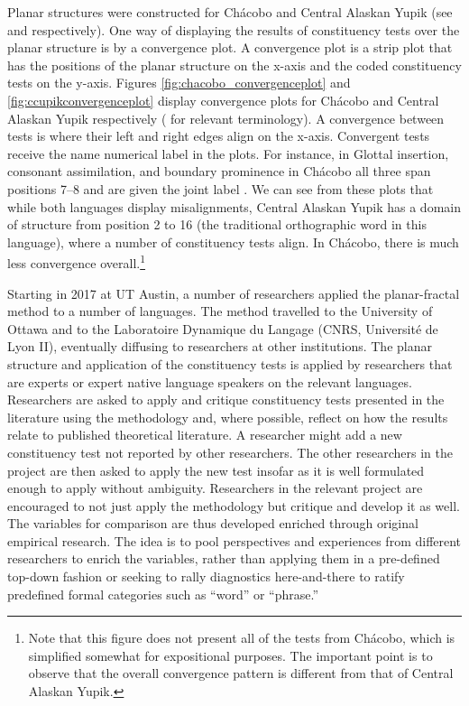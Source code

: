\documentclass[output=paper,hidelinks]{langscibook}
\begin{document}
Planar structures were constructed for Chácobo and Central Alaskan Yupik (see \cite{tallman2021constituency} and  respectively). One way of displaying the results of constituency tests over the planar structure is by a convergence plot. A convergence plot is a strip plot that has the positions of the planar structure on the x-axis and the coded constituency tests on the y-axis. Figures \ref{fig:chacobo_convergenceplot} and \ref{fig:ccupikconvergenceplot} display convergence plots for Chácobo and Central Alaskan Yupik respectively (\citealt{auderset2023constituency} for relevant terminology). A convergence between tests is where their left and right edges align on the x-axis. Convergent tests receive the name numerical label in the plots. For instance, in  Glottal insertion, consonant assimilation, and boundary prominence in Chácobo all three span positions 7--8 and are given the joint label . We can see from these plots that while both languages display misalignments, Central Alaskan Yupik has a domain of structure from position 2 to 16 (the traditional orthographic word in this language), where a number of constituency tests align. In Chácobo, there is much less convergence overall.\footnote{Note that this figure does not present all of the tests from Chácobo, which is simplified somewhat for expositional purposes. The important point is to observe that the overall convergence pattern is different from that of Central Alaskan Yupik.}



Starting in 2017 at UT Austin, a number of researchers applied the planar-fractal method to a number of languages. The method travelled to the University of Ottawa and to the Laboratoire Dynamique du Langage (CNRS, Université de Lyon II), eventually diffusing to researchers at other institutions. The planar structure and application of the constituency tests is applied by researchers that are experts or expert native language speakers on the relevant languages. Researchers are asked to apply and critique constituency tests presented in the literature using the methodology and, where possible, reflect on how the results relate to published theoretical literature. A researcher might add a new constituency test not reported by other researchers. The other researchers in the project are then asked to apply the new test insofar as it is well formulated enough to apply without ambiguity. Researchers in the relevant project are encouraged to not just apply the methodology but critique and develop it as well. The variables for comparison are thus developed enriched through original empirical research. The idea is to pool perspectives and experiences from different researchers to enrich the variables, rather than applying them in a pre-defined top-down fashion or seeking to rally diagnostics here-and-there to ratify predefined formal categories such as ``word'' or ``phrase.''
\end{document}
